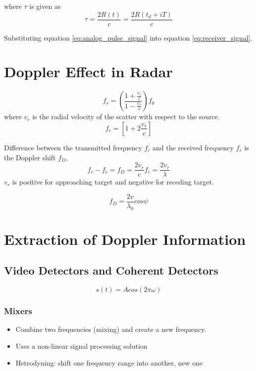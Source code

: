 where $\tau$ is given as
\begin{equation}
\tau = \frac{2R(t)}{c} = \frac{2R(t_d+iT)}{c}    
\end{equation}


Substituting equation \ref{eq:analog_pulse_signal} into equation \ref{eq:receiver_signal}.


\section{Doppler Effect in Radar}

\begin{equation}
    f_r = \left(\frac{1+\frac{v_r}{c}}{1-\frac{v_r}{c}}\right) f_0
\end{equation}
where $v_r$ is the radial velocity of the scatter with respect to the source.
\begin{equation}
    f_r = \left[ 1+2\frac{v_r}{c} \right]
\end{equation}

Difference between the transmitted frequency $f_c$ and the received frequency $f_r$ is the Doppler shift $f_D$,
\begin{equation}
f_r-f_c = f_D =\frac{2v_r}{c}f_c = \frac{2 v_r}{\lambda}
\end{equation}
$v_r$ is positive for approaching target and negative for receding target.


\begin{equation}
    f_D = \frac{2v}{\lambda_0}cos \psi
\end{equation}

\section{Extraction of Doppler Information}



\subsection{Video Detectors and Coherent Detectors}

\begin{equation}
s(t) = A cos(2\pi \omega )    
\end{equation}


\subsubsection{Mixers}
\begin{itemize}
    \item Combine two frequencies (mixing) and create a new frequency.
    \item Uses a non-linear signal processing solution
    \item Hetrodyning: shift one frequency range into another, new one
    
\end{itemize}

